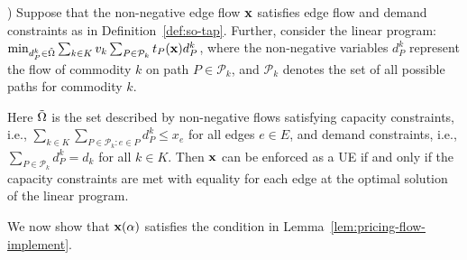 \documentclass{article}
\newif\ifarxiv   %
\begin{document}
\begin{lemma} 
\cite[Theorem 3.1]{multicommodity-extension})
\label{lem:pricing-flow-implement}
Suppose that the non-negative edge flow $\mathbf{x}$ satisfies edge flow and demand constraints as in Definition~\ref{def:so-tap}. Further, consider the linear program: $\min_{d_{P}^{k} \in \Tilde{\Omega}} \sum_{k \in K} v_k \sum_{P \in \mathcal{P}_k}  t_P(\mathbf{x}) d_{P}^{k}$, where the non-negative variables $d_{P}^{k}$ represent the flow of commodity $k$ on path $P \in \mathcal{P}_k$, and $\mathcal{P}_k$ denotes the set of all possible paths for commodity $k$.
\begin{comment}
\begin{mini!}|s|[2]                   %
    {\substack{d_{P}^{k} \in \Tilde{\Omega}}}                              %
    {\sum_{k \in K} v_k \sum_{P \in \mathcal{P}_k}  t_P(\x) d_{P}^{k}, \label{eq:OPT-Obj-Roughgarden}}   %
    {\label{eq:Eg001}}             %
    {}                                %
\end{mini!}
\end{comment}
Here $\Tilde{\Omega}$ is the set described by non-negative flows satisfying capacity
constraints, i.e., $\sum_{k \in K} \sum_{P \in \mathcal{P}_{k}: e \in P} d_{P}^{k} \leq x_e$ for all edges $e \in E$, and demand constraints, i.e., $\sum_{P \in \mathcal{P}_{k}} d_{P}^{k} = d_{k}$ for all $k \in K$. Then $\mathbf{x}$ can be enforced as a UE if and only if the capacity constraints are met with equality for each edge \ifarxiv $e \in E$ \fi at the optimal solution of the linear program.
\end{lemma}
\fi
\ifarxiv
In particular, if $\x(\alpha)$ satisfies the above necessary and sufficient condition then it can be enforced as a user equilibrium 
through edge prices set based on the dual variables of the capacity constraints of the above linear program. \fi %
We now show that $\x(\alpha)$ satisfies the \ifarxiv necessary and sufficient \fi condition in Lemma~\ref{lem:pricing-flow-implement}.
\end{document}
